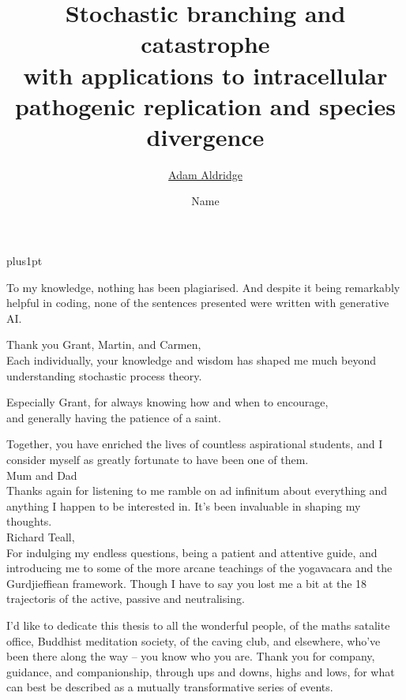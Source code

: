 \documentclass[twoside,12pt]{Classes/myThesis}
\title{\large{
    Stochastic branching and catastrophe\\
    \vspace{1pt} %
    with applications to intracellular\\
    \vspace{1pt} %
    pathogenic replication and species divergence
}}
\author{\href{mailto:email}{Adam Aldridge}}
\author{Name}
\theoremstyle{plain} %
\begin{document}
\renewcommand\baselinestretch{1.2}
\baselineskip=18pt plus1pt

\frontmatter
\ifpdf
\fi
\maketitle

\vfill
\noindent
To my knowledge, nothing has been plagiarised.  And despite it being remarkably helpful in coding,  none of the sentences presented were written with generative AI.   
\vfill

\pagebreak

\setcounter{secnumdepth}{2}
\setcounter{tocdepth}{2}


\ifpdf
\fi
%
\ifpdf
\fi
%
\ifpdf
\fi
%
\noindent
\begin{center}
\noindent
Thank you Grant, Martin, and Carmen,\\
\noindent
Each individually,  your knowledge and wisdom has shaped me much beyond understanding stochastic process theory. 

Especially Grant,  for always knowing how and when to encourage,  \\ and generally having the patience of a saint. 

Together, you have enriched the lives of countless aspirational students,  and I consider myself as greatly fortunate to have been one of them.\\

\vspace{29pt}
\noindent
Mum and Dad\\
\noindent
Thanks again for listening to me ramble on ad infinitum about everything and anything I happen to be interested in.  It's been invaluable in shaping my thoughts.\\


\vspace{29pt}
\noindent
Richard Teall, \\
For indulging my endless questions, being a patient and attentive guide,  and introducing me to some of the more arcane teachings of the yogavacara and the Gurdjieffiean framework.  Though I have to say you lost me a bit at the 18 trajectoris of the active,  passive and neutralising. 

\vspace{29pt}
\noindent

\noindent
I'd like to dedicate this thesis to all the wonderful people,  of the maths satalite office,  Buddhist meditation society,  of the caving club, and elsewhere,  who've been there along the way -- you know who you are.  Thank you for company,  guidance,  and companionship,  through ups and downs,  highs and lows,  for what can best be described as a mutually transformative series of events.



\end{center}
\end{document}
